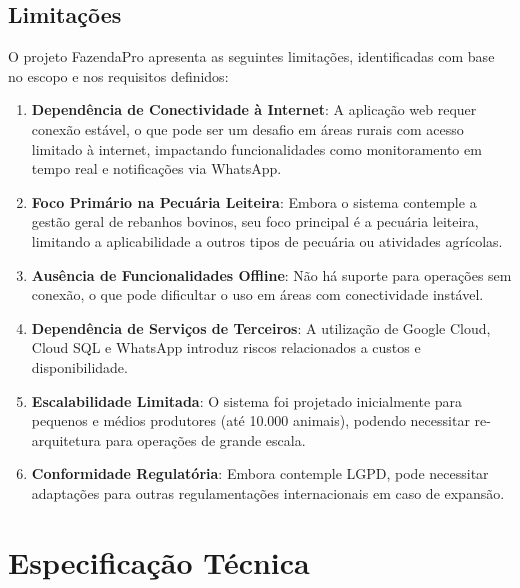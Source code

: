 \documentclass[12pt, a4paper]{article}
\begin{document}
\begin{spacing}{1.5}
\subsection{Limitações}
\begin{spacing}{1.5}
O projeto FazendaPro apresenta as seguintes limitações, identificadas com base no escopo e nos requisitos definidos:

\begin{enumerate}[label=\alph*)]
    \item \textbf{Dependência de Conectividade à Internet}: A aplicação web requer conexão estável, o que pode ser um desafio em áreas rurais com acesso limitado à internet, impactando funcionalidades como monitoramento em tempo real e notificações via WhatsApp.
    \item \textbf{Foco Primário na Pecuária Leiteira}: Embora o sistema contemple a gestão geral de rebanhos bovinos, seu foco principal é a pecuária leiteira, limitando a aplicabilidade a outros tipos de pecuária ou atividades agrícolas.
    \item \textbf{Ausência de Funcionalidades Offline}: Não há suporte para operações sem conexão, o que pode dificultar o uso em áreas com conectividade instável.
    \item \textbf{Dependência de Serviços de Terceiros}: A utilização de Google Cloud, Cloud SQL e WhatsApp introduz riscos relacionados a custos e disponibilidade.
    \item \textbf{Escalabilidade Limitada}: O sistema foi projetado inicialmente para pequenos e médios produtores (até 10.000 animais), podendo necessitar re-arquitetura para operações de grande escala.
    \item \textbf{Conformidade Regulatória}: Embora contemple LGPD, pode necessitar adaptações para outras regulamentações internacionais em caso de expansão.
\end{enumerate}
\end{spacing}

\section{Especificação Técnica}


\end{spacing}
\end{document}
